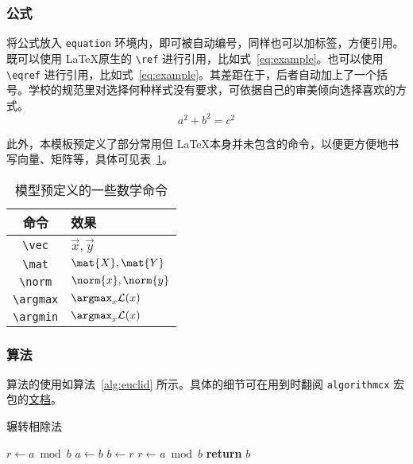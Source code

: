 \subsubsection{公式}

将公式放入 \verb|equation| 环境内，即可被自动编号，同样也可以加标签，方便引用。既可以使用 \LaTeX 原生的 \verb|\ref| 进行引用，比如式~\ref{eq:example}。也可以使用 \verb|\eqref| 进行引用，比如式~\eqref{eq:example}。其差距在于，后者自动加上了一个括号。学校的规范里对选择何种样式没有要求，可依据自己的审美倾向选择喜欢的方式。
\begin{equation}
\label{eq:example}
a^2 + b^2 = c^2
\end{equation}

此外，本模板预定义了部分常用但 \LaTeX 本身并未包含的命令，以便更方便地书写向量、矩阵等，具体可见表~\ref{table:math}。

\begin{table}[htb]
    \centering
    \caption{\label{table:math} 模型预定义的一些数学命令}
    \begin{tabularx}{.5\linewidth}{c X<{\centering\arraybackslash}}
        \hline
        命令 & 效果 \\
        \hline
        \verb|\vec| & $\vec{x}, \vec{y}$ \\
        \verb|\mat| & $\mat{X}, \mat{Y}$ \\
        \verb|\norm| & $\norm{x}, \norm{y}$ \\
        \verb|\argmax| & $\argmax_{x}\mathcal{L}(x)$ \\
        \verb|\argmin| & $\argmax_{x}\mathcal{L}(x)$ \\
        \hline
    \end{tabularx}
\end{table}

\subsubsection{算法}

算法的使用如算法~\ref{alg:euclid} 所示。具体的细节可在用到时翻阅 \verb|algorithmcx| 宏包的\href{http://mirrors.ctan.org/macros/latex/contrib/algorithmicx/algorithmicx.pdf}{文档}。

\begin{algorithm}
    \caption{\label{alg:euclid} 辗转相除法}
    \begin{algorithmic}[1]
    \State $r\gets a\bmod b$
    \State $a\gets b$
    \State $b\gets r$
    \State $r\gets a\bmod b$
    \EndWhile\label{euclidendwhile}
    \State \textbf{return} $b$
    \EndProcedure
    \end{algorithmic}
\end{algorithm}

